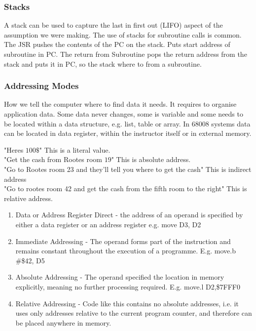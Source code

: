 \documentclass[a4paper]{article}
\theoremstyle{plain}
\theoremstyle{definition}
\newtheorem{exmp}{Example}[section]
\theoremstyle{remark}
\begin{document}
\subsubsection{Stacks}
A stack can be used to capture the last in first out (LIFO) aspect of the assumption we were making. The use of stacks for subroutine calls is common. The JSR pushes the contents of the PC on the stack. Puts start address of subroutine in PC. The return from Subroutine pops the return address from the stack and puts it in PC, so the stack where to from a subroutine.

\subsubsection{Addressing Modes}
How we tell the computer where to find data it needs. It requires to organise application data. Some data never changes, some is variable and some needs to be located within a data structure, e.g. list, table or array.
In $68008$ systems data can be located in data register, within the instructor itself or in external memory.
\begin{tcolorbox}[colback=black!3!white,colframe=black!60!white,title=\begin{exmp}Example \label{Example}\end{exmp}]
        "Heres $100 \$ $" This is a literal value. \\
	"Get the cash from Rootes room $19$" This is absolute address.\\
	"Go to Rootes room 23 and they'll tell you where to get the cash" This is indirect address \\ 
	"Go to rootes room 42 and get the cash from the fifth room to the right" This is relative address.
\end{tcolorbox}
\begin{enumerate}
	\item Data or Address Register Direct - the address of an operand is specified by either a data register or an address register e.g. move  D3, D2
	\item Immediate Addressing - The operand forms part of the instruction and remains constant throughout the execution of a programme. E.g. move.b #\$42, D5 
	\item Absolute Addressing - The operand specified the location in memory explicitly, meaning no further processing required. E.g. move.l D2,\$7FFF0
	\item Relative Addressing - Code like this contains no absolute addresses, i.e. it uses only addresses relative to the current program counter, and therefore can be placed anywhere in memory.
\end{enumerate}
\end{document}
